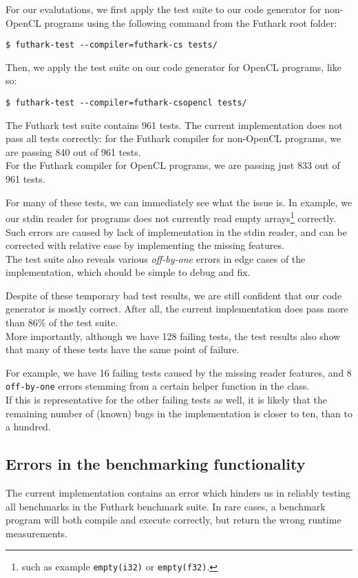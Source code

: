 For our evalutations, we first apply the test suite to our \csharp{}
code generator for non-OpenCL programs using the following command from the
Futhark root folder:
\begin{verbatim}
$ futhark-test --compiler=futhark-cs tests/
\end{verbatim}

Then, we apply the test suite on our code generator for \csharp{} OpenCL
programs, like so:
\begin{verbatim}
$ futhark-test --compiler=futhark-csopencl tests/
\end{verbatim}

The Futhark test suite contains 961 tests.
The current implementation does not pass all tests correctly: for the Futhark
\csharp{} compiler for non-OpenCL programs, we are passing 840 out of 961 tests.\\
For the Futhark \csharp{} compiler for OpenCL programs, we are passing just 833
out of 961 tests.

For many of these tests, we can immediately see what the issue is. In example,
we our stdin reader for \csharp{} programs does not currently read empty
arrays\footnote{such as example \texttt{empty(i32)} or \texttt{empty(f32)}.}
correctly. Such errors are caused by lack of implementation in the stdin reader, and can be
corrected with relative ease by implementing the missing features.\\
The test suite also reveals various \textit{off-by-one} errors in edge cases of
the implementation, which should be simple to debug and fix.

Despite of these temporary bad test results, we are still confident that our
code generator is mostly correct. After all, the current implementation does
pass more than 86\% of the test suite.
\\
More importantly, although we have 128 failing tests, the test results also show
that many of these tests have the same point of failure.

For example, we have 16 failing tests caused by the missing reader features, and 8
\texttt{off-by-one} errors stemming from a certain helper function in the
\csharp{} class.
\\
If this is representative for the other failing tests as well, it is likely that
the remaining number of (known) bugs in the implementation is closer to ten, than
to a hundred.

\subsection{Errors in the benchmarking functionality}
\label{sec:errorsinbenchmark}
The current implementation contains an error which hinders us in reliably
testing all benchmarks in the Futhark benchmark suite. In rare cases, a
benchmark program will both compile and execute correctly, but
return the wrong runtime measurements.

